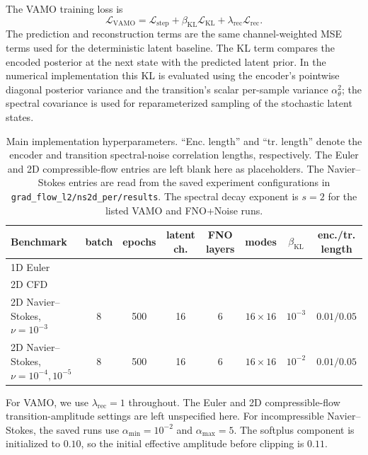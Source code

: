 \documentclass[11pt]{article}
\begin{document}
The VAMO training loss is
\[
    \mathcal L_{\mathrm{VAMO}}
    =
    \mathcal L_{\mathrm{step}}
    +\beta_{\mathrm{KL}}\mathcal L_{\mathrm{KL}}
    +\lambda_{\mathrm{rec}}\mathcal L_{\mathrm{rec}} .
\]
The prediction and reconstruction terms are the same channel-weighted MSE terms
used for the deterministic latent baseline. The KL term compares the encoded
posterior at the next state with the predicted latent prior. In the numerical
implementation this KL is evaluated using the encoder's pointwise diagonal
posterior variance and the transition's scalar per-sample variance
$\alpha_\theta^2$; the spectral covariance is used for reparameterized sampling
of the stochastic latent states.

\begin{table}[t]
    \centering
    \caption{
    Main implementation hyperparameters. ``Enc. length'' and ``tr. length''
    denote the encoder and transition spectral-noise correlation lengths,
    respectively. The Euler and 2D compressible-flow entries are left blank here
    as placeholders. The Navier--Stokes entries are read from the saved
    experiment configurations in \texttt{grad\_flow\_l2/ns2d\_per/results}.
    The spectral decay exponent is $s=2$ for the listed VAMO and FNO+Noise
    runs.
    }
    \label{tab:implementation_hyperparameters}
    \begin{tabular}{lccccccc}
        \toprule
        Benchmark
        & batch
        & epochs
        & latent ch.
        & FNO layers
        & modes
        & $\beta_{\mathrm{KL}}$
        & enc./tr. length \\
        \midrule
        1D Euler
        & & & & & & & \\
        2D CFD
        & & & & & & & \\
        2D Navier--Stokes, $\nu=10^{-3}$
        & 8 & 500 & 16 & 6 & $16\times16$
        & $10^{-3}$
        & $0.01/0.05$ \\
        2D Navier--Stokes, $\nu=10^{-4},10^{-5}$
        & 8 & 500 & 16 & 6 & $16\times16$
        & $10^{-2}$
        & $0.01/0.05$ \\
        \bottomrule
    \end{tabular}
\end{table}

For VAMO, we use $\lambda_{\mathrm{rec}}=1$ throughout. The Euler and 2D
compressible-flow transition-amplitude settings are left unspecified here. For
incompressible Navier--Stokes, the saved runs use $\alpha_{\min}=10^{-2}$ and
$\alpha_{\max}=5$. The softplus component is initialized to $0.10$, so the
initial effective amplitude before clipping is $0.11$.
\end{document}
